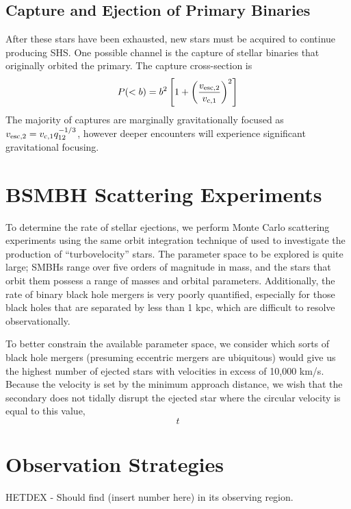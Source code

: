 \documentclass[a4paper,twocolumn]{emulateapj}
\begin{document}
\subsection{Capture and Ejection of Primary Binaries}

After these stars have been exhausted, new stars must be acquired to continue producing SHS. One possible channel is the capture of stellar binaries that originally orbited the primary. The capture cross-section is
\begin{equation}
P(< b) = b^2 \left[1 + \left(\frac{v_{\rm esc,2}}{v_{\rm c,1}}\right)^2 \right]
\end{equation}
The majority of captures are marginally gravitationally focused as $v_{\rm esc,2} = v_{\rm c,1} q_{12}^{-1/3}$, however deeper encounters will experience significant gravitational focusing.

\section{BSMBH Scattering Experiments}
To determine the rate of stellar ejections, we perform Monte Carlo scattering experiments using the same orbit integration technique of \citet{Manukian:2013ce} used to investigate the production of ``turbovelocity'' stars. The parameter space to be explored is quite large; SMBHs range over five orders of magnitude in mass, and the stars that orbit them possess a range of masses and orbital parameters. Additionally, the rate of binary black hole mergers is very poorly quantified, especially for those black holes that are separated by less than 1 kpc, which are difficult to resolve observationally.

To better constrain the available parameter space, we consider which sorts of black hole mergers (presuming eccentric mergers are ubiquitous) would give us the highest number of ejected stars with velocities in excess of 10,000 km/s. Because the velocity is set by the minimum approach distance, we wish that the secondary does not tidally disrupt the ejected star where the circular velocity is equal to this value,
\begin{equation}
t
\end{equation}

\section{Observation Strategies}

HETDEX - Should find (insert number here) in its observing region.
\end{document}
